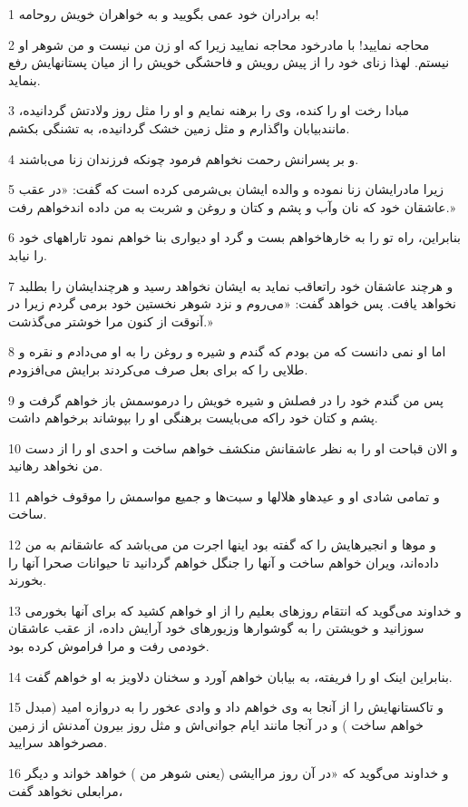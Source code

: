 \par 1 به برادران خود عمی بگویید و به خواهران خویش روحامه!
\par 2 محاجه نمایید! با مادرخود محاجه نمایید زیرا که او زن من نیست و من شوهر او نیستم. لهذا زنای خود را از پیش رویش و فاحشگی خویش را از میان پستانهایش رفع بنماید.
\par 3 مبادا رخت او را کنده، وی را برهنه نمایم و او را مثل روز ولادتش گردانیده، مانندبیابان واگذارم و مثل زمین خشک گردانیده، به تشنگی بکشم.
\par 4 و بر پسرانش رحمت نخواهم فرمود چونکه فرزندان زنا می‌باشند.
\par 5 زیرا مادرایشان زنا نموده و والده ایشان بی‌شرمی کرده است که گفت: «در عقب عاشقان خود که نان وآب و پشم و کتان و روغن و شربت به من داده اندخواهم رفت.»
\par 6 بنابراین، راه تو را به خارهاخواهم بست و گرد او دیواری بنا خواهم نمود تاراههای خود را نیابد.
\par 7 و هر‌چند عاشقان خود راتعاقب نماید به ایشان نخواهد رسید و هر‌چندایشان را بطلبد نخواهد یافت. پس خواهد گفت: «می‌روم و نزد شوهر نخستین خود برمی گردم زیرا در آنوقت از کنون مرا خوشتر می‌گذشت.»
\par 8 اما او نمی دانست که من بودم که گندم و شیره و روغن را به او می‌دادم و نقره و طلایی را که برای بعل صرف می‌کردند برایش می‌افزودم.
\par 9 پس من گندم خود را در فصلش و شیره خویش را درموسمش باز خواهم گرفت و پشم و کتان خود راکه می‌بایست برهنگی او را بپوشاند برخواهم داشت.
\par 10 و الان قباحت او را به نظر عاشقانش منکشف خواهم ساخت و احدی او را از دست من نخواهد رهانید.
\par 11 و تمامی شادی او و عیدهاو هلالها و سبت‌ها و جمیع مواسمش را موقوف خواهم ساخت.
\par 12 و موها و انجیرهایش را که گفته بود اینها اجرت من می‌باشد که عاشقانم به من داده‌اند، ویران خواهم ساخت و آنها را جنگل خواهم گردانید تا حیوانات صحرا آنها را بخورند.
\par 13 و خداوند می‌گوید که انتقام روزهای بعلیم را از او خواهم کشید که برای آنها بخورمی سوزانید و خویشتن را به گوشوارها وزیورهای خود آرایش داده، از عقب عاشقان خودمی رفت و مرا فراموش کرده بود.
\par 14 بنابراین اینک او را فریفته، به بیابان خواهم آورد و سخنان دلاویز به او خواهم گفت.
\par 15 و تاکستانهایش را از آنجا به وی خواهم داد و وادی عخور را به دروازه امید (مبدل خواهم ساخت ) و در آنجا مانند ایام جوانی‌اش و مثل روز بیرون آمدنش از زمین مصرخواهد سرایید.
\par 16 و خداوند می‌گوید که «در آن روز مراایشی (یعنی شوهر من ) خواهد خواند و دیگر مرابعلی نخواهد گفت،
